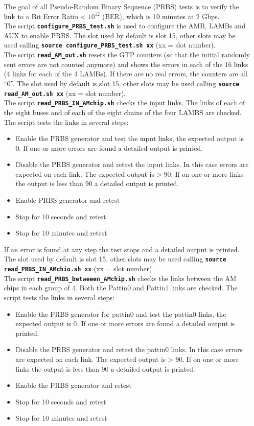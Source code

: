 The goal of all Pseudo-Random Binary Sequence (PRBS) tests is to verify the link to a Bit Error Ratio < $10^{12}$ (BER), which is 10 minutes at 2 Gbps.\\
The script \textbf{\texttt{configure\_PRBS\_test.sh}} is used to configure the AMB, LAMBs and AUX to enable PRBS. The slot used by default is slot 15, other slots may be used calling \textbf{\texttt{source configure\_PRBS\_test.sh xx}} (xx = slot number).\\
The script \textbf{\texttt{read\_AM\_out.sh}}
resets the GTP counters (so that the initial randomly sent errors are not counted anymore) and shows the errors in each of the 16 links (4 links for each of the 4 LAMBs). If there are no real errors, the counters are all “0”.
The slot used by default is slot 15, other slots may be used calling \textbf{\texttt{source read\_AM\_out.sh xx}} (xx = slot number).\\
The script \textbf{\texttt{read\_PRBS\_IN\_AMchip.sh}} checks the input links. The links of each of the eight buses and of each of the eight chains of the four LAMBS are checked. The script tests the links in several steps:
\begin{itemize}
\item Enable the PRBS generator and test the input links, the expected output is 0. If one or more errors are found a detailed output is printed.
\item Disable the PRBS generator and retest the input links. In this case errors are expected on each link. The expected output is > 90. If on one or more links the output is less than 90 a detailed output is printed.
\item Enable PRBS generator and retest 
\item Stop for 10 seconds and retest 
\item Stop for 10 minutes and retest
\end{itemize}
If an error is found at any step the test stops and a detailed output is printed.
The slot used by default is slot 15, other slots may be used calling \textbf{\texttt{source read\_PRBS\_IN\_AMchio.sh xx}} (xx = slot number).\\
The script \textbf{\texttt{read\_PRBS\_betweeen\_AMchip.sh}} checks the links between the AM chips in each group of 4. 
Both the Pattin0 and Pattin1 links are checked.
The script tests the links in several steps:
\begin{itemize}
\item Enable the PRBS generator for pattin0 and test the pattin0 links, the expected output is 0. If one or more errors are found a detailed output is printed.
\item Disable the PRBS generator and retest the pattin0 links. In this case errors are expected on each link. The expected output is > 90. If on one or more links the output is less than 90 a detailed output is printed.
\item Enable the PRBS generator and retest 
\item Stop for 10 seconds and retest 
\item Stop for 10 minutes and retest
\end{itemize}
